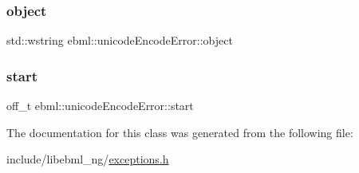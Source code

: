 \subsubsection{\texorpdfstring{object}{object}}
{\footnotesize\ttfamily std\+::wstring ebml\+::unicode\+Encode\+Error\+::object}

\mbox{\label{classebml_1_1unicodeEncodeError_a21775eb92e0b457166aa64892816fe68}} 
\subsubsection{\texorpdfstring{start}{start}}
{\footnotesize\ttfamily off\+\_\+t ebml\+::unicode\+Encode\+Error\+::start}



The documentation for this class was generated from the following file\+:\begin{DoxyCompactItemize}
\item 
include/libebml\+\_\+ng/\mbox{\hyperlink{exceptions_8h}{exceptions.\+h}}\end{DoxyCompactItemize}
